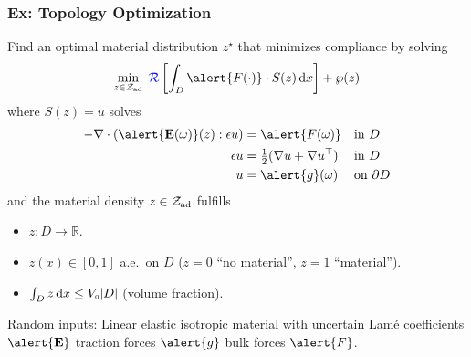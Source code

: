 \documentclass[aspectratio=169,xcolor=dvipsnames,10pt]{beamer}
\newcommand{\Zad}{\mathcal{Z}_{\text{\textup{ad}}}}
\newcommand{\risk}{\mathcal{R}}
\begin{document}
\begin{frame}\frametitle{Ex: Topology Optimization}

\begin{exampleblock}{}
\smaller
Find an optimal material distribution $z^{\star}$ that minimizes compliance by solving
      \[
      \min_{z \in \Zad}\;
         {\color{blue}\risk}\left[
            \int_D \alert{F(\cdot)}\cdot S(z)\,\mathrm{d}x\right] + \wp(z)
      \]
      where $S(z)=u$ solves \vspace{-1ex}
      \begin{align*}
        -\nabla\cdot(\alert{\mathbf{E}(\omega)}(z):\epsilon u)
            =&\; \alert{F(\omega)} &&\text{in }D\textcolor{white}{.} \\
        \epsilon u =&\;
           \tfrac{1}{2}(\nabla u + \nabla u^\top)
           &&\text{in }D\textcolor{white}{.}\\
         u =&\; \alert{g}(\omega) &&\text{on }\partial D
      \end{align*}
and the material density $z \in \Zad$ fulfills 
\begin{itemize}
\item $z : D \to \mathbb R$.
\item $z(x) \in [0,1]$ a.e.\ on $D$ ($z = 0$ ``no material'', $z = 1$ ``material'').
\item  $\int_D z\,\mathrm{d}x \le V_{\textup{\tiny 0}}|D|$ (volume fraction).
\end{itemize}
 
Random inputs: Linear elastic isotropic material with \alert{uncertain}
Lam\'e coefficients $\alert{\mathbf{E}}$
traction forces $\alert{g}$ 
 bulk forces $\alert{F}$.

\end{exampleblock}
\end{frame}
\end{document}
